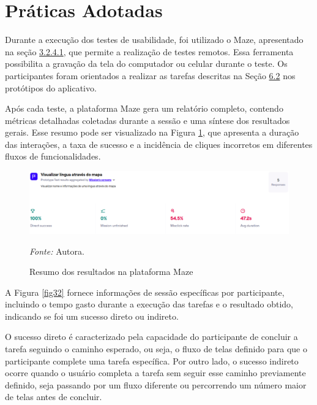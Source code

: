 \section{Práticas Adotadas}
\label{sec:Práticas Adotadas}
Durante a execução dos testes de usabilidade, foi utilizado o Maze, apresentado na seção \hyperref[{sec:Maze}]{3.2.4.1}, que permite a realização de testes remotos. Essa ferramenta possibilita a gravação da tela do computador ou celular 
durante o teste. Os participantes foram orientados a realizar as tarefas descritas na Seção \hyperref[sec:Cenários de Uso]{6.2} nos protótipos do aplicativo.

Após cada teste, a plataforma Maze gera um relatório completo, contendo métricas detalhadas coletadas durante a sessão e uma síntese dos resultados gerais. Esse resumo pode ser visualizado na Figura \ref{fig31}, que apresenta a duração das interações, a taxa de sucesso e 
a incidência de cliques incorretos em diferentes fluxos de funcionalidades.

\begin{figure}[h!]
	\centering
	\caption{Resumo dos resultados na plataforma Maze}
	\begin{adjustbox}{center}
		\includegraphics[width=1\textwidth]{figuras/maze.eps}
	\end{adjustbox}
	\begin{tablenotes}[flushleft]
		\centering
		\item \textit{Fonte:} Autora.
	\end{tablenotes}
	\label{fig31}
\end{figure}

A Figura \ref{fig32} fornece informações de sessão específicas por participante, incluindo o tempo gasto durante a execução das tarefas e o resultado obtido, indicando se foi um sucesso direto ou indireto.

O sucesso direto é caracterizado pela capacidade do participante de concluir a tarefa seguindo o caminho esperado, ou seja, o fluxo de telas definido para que o participante complete uma tarefa específica. Por outro lado, o sucesso indireto ocorre quando o usuário completa a tarefa 
sem seguir esse caminho previamente definido, seja passando por um fluxo diferente ou percorrendo um número maior de telas antes de concluir.

